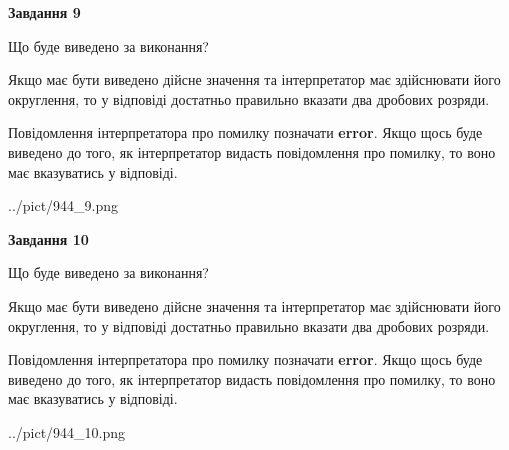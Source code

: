 \documentclass[12pt, ukrainian]{article}
\begin{document}
{\begin {Large}
{\begin {center}\textbf{Завдання 9}\end {center}}\par
Що буде виведено за виконання? \par

Якщо має бути виведено дійсне значення та інтерпретатор має здійснювати його округлення, 
то у відповіді достатньо правильно вказати два дробових розряди.

Повідомлення інтерпретатора про помилку позначати \textbf{error}.
Якщо щось буде виведено до того, як інтерпретатор видасть повідомлення про помилку, 
то воно має вказуватись у відповіді. \par

\begin{center}
	{../pict/944_9.png}
\end{center}
\newpage

{\begin {center}\textbf{Завдання 10}\end {center}}\par
Що буде виведено за виконання? \par

Якщо має бути виведено дійсне значення та інтерпретатор має здійснювати його округлення, 
то у відповіді достатньо правильно вказати два дробових розряди.

Повідомлення інтерпретатора про помилку позначати \textbf{error}.
Якщо щось буде виведено до того, як інтерпретатор видасть повідомлення про помилку, 
то воно має вказуватись у відповіді. \par

\begin{center}
	{../pict/944_10.png}
\end{center}
\newpage

\end {Large}}
\end{document}
